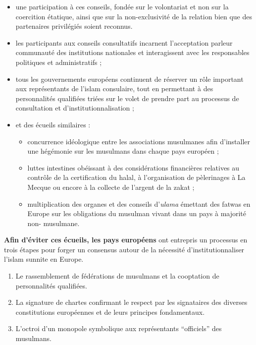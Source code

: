 \begin{itemize}
\item
  une participation à ces conseils, fondée sur le volontariat et non sur
  la coercition étatique, ainsi que sur la non-exclusivité de la
  relation bien que des partenaires privilégiés soient reconnus.
\item
  les participants aux conseils consultatifs incarnent l'acceptation
  parleur communauté des institutions nationales et interagissent avec
  les responsables politiques et administratifs ;
\item
  tous les gouvernements européens continuent de réserver un rôle
  important aux représentants de l'islam consulaire, tout en permettant
  à des personnalités qualifiées triées sur le volet de prendre part au
  processus de consultation et d'institutionnalisation ;
\item
  et des écueils similaires :

  \begin{itemize}
  \item
    concurrence idéologique entre les associations musulmanes afin
    d'installer une hégémonie sur les musulmans dans chaque pays
    européen ;
  \item
    luttes intestines obéissant à des considérations financières
    relatives au contrôle de la certification du halal, à l'organisation
    de pèlerinages à La Mecque ou encore à la collecte de l'argent de la
    zakat ;
  \item
    multiplication des organes et des conseils d'\emph{ulama} émettant
    des fatwas en Europe sur les obligations du musulman vivant dans un
    pays à majorité non- musulmane.
  \end{itemize}
\end{itemize}


\textbf{Afin d'éviter ces écueils, les pays européens} ont entrepris un
processus en trois étapes pour forger un consensus autour de la
nécessité d'institutionnaliser l'islam sunnite en Europe.


\begin{enumerate}
\def\labelenumi{\arabic{enumi}.}
\item
  Le rassemblement de fédérations de musulmans et la cooptation de
  personnalités qualifiées.
\item
  La signature de chartes confirmant le respect par les signataires des
  diverses constitutions européennes et de leurs principes fondamentaux.
\item
  L'octroi d'un monopole symbolique aux représentants ``officiels'' des
  musulmans.
\end{enumerate}

